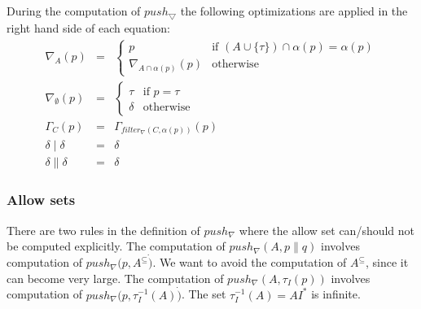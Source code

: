 \documentclass{article}
\begin{document}
During the computation of $push_{\bigtriangledown }$ the following
optimizations are applied in the right hand side of each equation:%
\[
\begin{array}{lll}
\nabla _{A}(p) & = & \left\{ 
\begin{array}{ll}
p & \text{if }(A\cup \{\tau \})\cap \alpha (p)=\alpha (p) \\ 
\nabla _{A\cap \alpha (p)}(p) & \text{otherwise}%
\end{array}%
\right. \\ 
\nabla _{\emptyset }(p) & = & \left\{ 
\begin{array}{ll}
\tau & \text{if }p=\tau \\ 
\delta & \text{otherwise}%
\end{array}%
\right. \\ 
\Gamma _{C}(p) & = & \Gamma _{filter_{\nabla }(C,\alpha (p))}(p) \\ 
\delta \mid \delta & = & \delta \\ 
\delta \parallel \delta & = & \delta%
\end{array}%
\]

\subsubsection{Allow sets}

There are two rules in the definition of $push_{\nabla }$ where the allow
set can/should not be computed explicitly. The computation of $push_{\nabla
}(A,p\parallel q)$ involves computation of $push_{\nabla }(p,A^{\subseteq }%
\dot{)}$. We want to avoid the computation of $A^{\subseteq }$, since it can
become very large. The computation of $push_{\nabla }(A,\tau _{I}(p))$
involves computation of $push_{\nabla }(p,\tau _{I}^{-1}(A)\dot{)}$. The set 
$\tau _{I}^{-1}(A)=AI^{\ast }$ is infinite.
\end{document}
